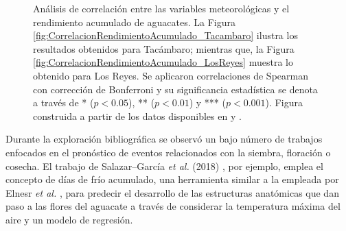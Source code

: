 \begin{figure}[ht]
\centering
{}
\hfill
{}
\caption{Análisis de correlación entre las variables meteorológicas y el rendimiento acumulado de aguacates. La Figura \ref{fig:CorrelacionRendimientoAcumulado_Tacambaro} ilustra los resultados obtenidos para Tacámbaro; mientras que, la Figura \ref{fig:CorrelacionRendimientoAcumulado_LosReyes} muestra lo obtenido para Los Reyes. Se aplicaron correlaciones de Spearman con corrección de Bonferroni y su significancia estadística se denota a través de * ($p<0.05$), ** ($p<0.01$) y *** ($p<0.001$). Figura construida a partir de los datos disponibles en \cite{AvanceSiembrasCosechas} y \cite{Rodriguez-Moreno_2021}.}
\label{fig:CorrelacionRendimientoAcumulado}
\end{figure}

Durante la exploración bibliográfica se observó un bajo número de trabajos enfocados en el pronóstico de eventos relacionados con la siembra, floración o cosecha. El trabajo de Salazar--García \textit{et al.} (2018) \cite{Salazar_2018}, por ejemplo, emplea el concepto de días de frío acumulado, una herramienta similar a la empleada por Elnesr \textit{et al.} \cite{Elnesr_2016, Elnesr_2013}, para predecir el desarrollo de las estructuras anatómicas que dan paso a las flores del aguacate a través de considerar la temperatura máxima del aire y un modelo de regresión.\\

